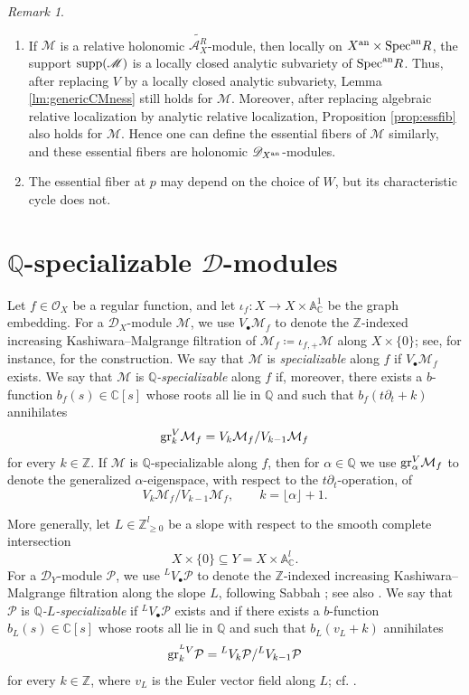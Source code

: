 \documentclass{amsart}
\theoremstyle{plain}
\numberwithin{theorem}{section}
\theoremstyle{definition}
\theoremstyle{remark}
\newtheorem{remark}[theorem]{Remark}
\theoremstyle{definition}
\newcommand{\wt}{\widetilde}
\newcommand{\A}{\mathbb{A}}
\newcommand{\C}{\mathbb{C}} %
\newcommand{\Q}{\mathbb{Q}}
\newcommand{\Z}{\mathbb{Z}}
\newcommand{\cM}{\mathcal{M}}
\newcommand{\cO}{\mathscr{O}}
\newcommand{\cP}{\mathcal{P}}
\newcommand{\gr}{\textup{gr}}
\newcommand{\sM}{\mathscr{M}}
\newcommand{\sA}{\mathscr{A}}
\newcommand{\shD}{\mathscr{D}}
\newcommand{\Specan}{\textup{Spec}^{\textup{an}}}
\newcommand{\an}{\textup{an}}
\newcommand{\supp}{\textup{supp}}
\begin{document}
\begin{remark}
\begin{enumerate}[label=$(\arabic*)$]
    \item If $\sM$ is a relative holonomic $\wt{\sA_X^R}$-module, then locally
    on $X^\an\times \Specan R$, the support $\supp(\sM)$ is a locally closed
    analytic subvariety of $\Specan R$. Thus, after replacing $V$ by a locally
    closed analytic subvariety, Lemma \ref{lm:genericCMness} still holds for
    $\sM$. Moreover, after replacing algebraic relative localization by
    analytic relative localization, Proposition \ref{prop:essfib} also holds
    for $\sM$. Hence one can define the essential fibers of $\sM$ similarly,
    and these essential fibers are holonomic $\shD_{X^\an}$-modules.

    \item The essential fiber at $p$ may depend on the choice of $W$, but its
    characteristic cycle does not.
\end{enumerate}
\end{remark}


\section{$\Q$-specializable $\shD$-modules}\label{sect:Qspecial}

Let $f\in \cO_X$ be a regular function, and let
$\iota_f\colon X\rightarrow X\times \A_\C^1$
be the graph embedding. For a $\shD_X$-module $\cM$, we use
$V_\bullet\cM_f$ to denote the $\Z$-indexed increasing
Kashiwara--Malgrange filtration of
$\cM_f\coloneqq \iota_{f,+}\cM$
along $X\times\{0\}$; see, for instance, \cite[\S 4.1]{Wuch} for the
construction. We say that $\cM$ is \emph{specializable} along $f$ if
$V_\bullet\cM_f$ exists. We say that $\cM$ is \emph{$\Q$-specializable}
along $f$ if, moreover, there exists a $b$-function
$b_f(s)\in \C[s]$
whose roots all lie in $\Q$ and such that
$b_f(t\partial_t+k)$
annihilates
\[
\gr^V_k\cM_f=V_k\cM_f/V_{k-1}\cM_f
\]
for every $k\in \Z$. If $\cM$ is $\Q$-specializable along $f$, then for
$\alpha\in \Q$ we use
$\gr^V_\alpha \cM_f$
to denote the generalized $\alpha$-eigenspace, with respect to the
$t\partial_t$-operation, of
\[
V_k\cM_f/V_{k-1}\cM_f,
\qquad
k=\lfloor \alpha\rfloor+1.
\]

More generally, let
$L\in \Z_{\ge 0}^l$
be a slope with respect to the smooth complete intersection
\[
X\times\{0\}\subseteq Y=X\times \A_\C^l.
\]
For a $\shD_Y$-module $\cP$, we use ${}^L V_\bullet\cP$ to denote the
$\Z$-indexed increasing Kashiwara--Malgrange filtration along the slope $L$,
following Sabbah \cite{Sab}; see also \cite[Def.4.14]{Wuch}. We say that
$\cP$ is \emph{$\Q$-$L$-specializable} if ${}^L V_\bullet\cP$ exists and if
there exists a $b$-function
$b_L(s)\in \C[s]$
whose roots all lie in $\Q$ and such that
$b_L(v_L+k)$
annihilates
\[
\gr^{{}^LV}_k\cP={}^L V_k\cP/{}^L V_{k-1}\cP
\]
for every $k\in \Z$, where $v_L$ is the Euler vector field along $L$; cf.
\cite[Remark 4.13]{Wuch}.
\end{document}
